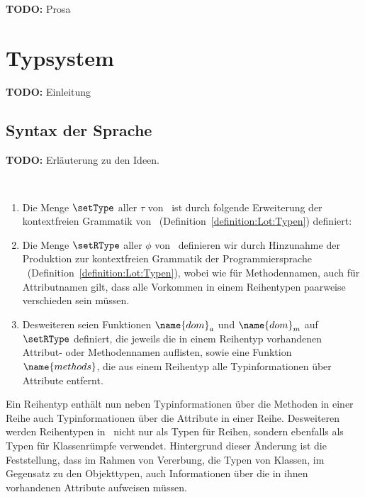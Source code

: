 {\bf TODO:} Prosa



\section{Typsystem}

{\bf TODO:} Einleitung



\subsection{Syntax der Sprache \Lct}

{\bf TODO:} Erl\"auterung zu den Ideen.

\begin{definition}[Typen] \label{definition:Lct:Typen} \
  \begin{enumerate}
    \item Die Menge $\setType$ aller  $\tau$ von \Lct\ ist durch
          folgende Erweiterung der kontextfreien Grammatik von \Lot\ (Definition~\ref{definition:Lot:Typen})
          definiert:
          \GRbeg
          \tau \GRis {}
          \GRend

    \item Die Menge $\setRType$ aller  $\phi$ von \Lct\ definieren wir
          durch Hinzunahme der Produktion
          \GRbeg
          \phi \GRis {}
          \GRend
          zur kontextfreien Grammatik der Programmiersprache \Lot\ (Definition~\ref{definition:Lot:Typen}),
          wobei wie f\"ur Methodennamen, auch f\"ur Attributnamen gilt, dass alle Vorkommen in einem
          Reihentypen paarweise verschieden sein m\"ussen.

    \item Desweiteren seien Funktionen $\name{dom}_a$ und $\name{dom}_m$ auf $\setRType$ definiert,
          die jeweils die in einem Reihentyp vorhandenen Attribut- oder Methodennamen auflisten,
          sowie eine Funktion $\name{methods}$, die aus einem Reihentyp alle Typinformationen
          \"uber Attribute entfernt.
  \end{enumerate}
\end{definition}

Ein Reihentyp enth\"alt nun neben Typinformationen \"uber die Methoden in einer Reihe auch
Typinformationen \"uber die Attribute in einer Reihe. Desweiteren werden Reihentypen in \Lct\ 
nicht nur als Typen f\"ur Reihen, sondern ebenfalls als Typen f\"ur Klassenr\"umpfe verwendet.
Hintergrund dieser \"Anderung ist die Feststellung, dass im Rahmen von Vererbung, die Typen
von Klassen, im Gegensatz zu den Objekttypen, auch Informationen \"uber die in ihnen vorhandenen
Attribute aufweisen m\"ussen.

